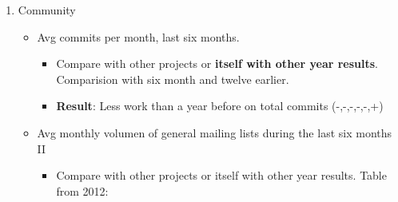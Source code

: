 \documentclass[11pt]{scrartcl}
\begin{document}
\begin{enumerate}
\begin{itemize}
	    \item Documentation
    	    \begin{itemize}
                \item Online tutorials - Development
                \item Offline tutorials - SVNBook\footnote{http://svnbook.red-bean.com/}
                \item Hello World - Tutorial to initialize a Repository in 10 minutes.
                \item Books from the author, authors or company -  SVNBook
                \item Languages - Various Languages (Deutsch | English | français | Español | Italiano | 日本語 | norsk | Português | Русский | 中文)
            \end{itemize}
    \end{itemize}

    \item Community
    \begin{itemize}
	    \item Avg commits per month, last six months.
	        \begin{itemize}
                \item Compare with other projects or \textbf{itself with other year results}. Comparision with six month and twelve earlier.
                \item \textbf{Result}: Less work than a year before on total commits (-,-,-,-,-,+)
            \end{itemize}
	    \item Avg monthly volumen of general mailing lists during the last six months II
	    \begin{itemize}
            \item Compare with other projects or itself with other year results. Table from 2012:


\end{itemize}
\end{itemize}
\end{enumerate}
\end{document}

